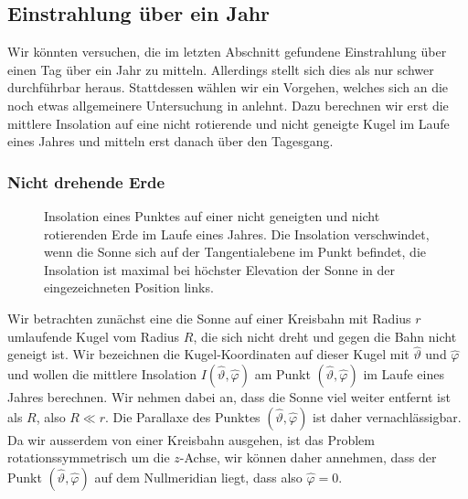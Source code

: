 %
%
%
\subsection{Einstrahlung über ein Jahr}
Wir könnten versuchen, die im letzten Abschnitt gefundene Einstrahlung
über einen Tag über ein Jahr zu mitteln.
Allerdings stellt sich dies als nur schwer durchführbar heraus.
Stattdessen wählen wir ein Vorgehen, welches  sich an die 
noch etwas allgemeinere Untersuchung in 
\cite[section 5]{skript:mcgeheelehman}
anlehnt.
Dazu berechnen wir erst die mittlere Insolation auf eine nicht
rotierende und nicht geneigte Kugel im Laufe eines Jahres und
mitteln erst danach über den Tagesgang.

\subsubsection{Nicht drehende Erde}
\begin{figure}%
\centering%
\caption{Insolation eines Punktes auf einer nicht geneigten 
und nicht rotierenden Erde im Laufe eines Jahres.
Die Insolation verschwindet, wenn die Sonne sich auf der Tangentialebene
im Punkt befindet, die Insolation ist maximal bei höchster Elevation
der Sonne in der eingezeichneten Position links.
\label{skript:insolation:fest}}
\end{figure}%
Wir betrachten zunächst eine die Sonne auf einer Kreisbahn mit Radius $r$
umlaufende Kugel vom Radius $R$, die sich nicht dreht und gegen die Bahn
nicht geneigt ist.
Wir bezeichnen die Kugel-Koordinaten auf dieser Kugel mit $\hat\vartheta$
und $\hat\varphi$ und wollen die mittlere Insolation
$I(\hat\vartheta,\hat\varphi)$ am Punkt $(\hat\vartheta,\hat\varphi)$
im Laufe eines Jahres berechnen.
Wir nehmen dabei an, dass die Sonne viel weiter entfernt ist als $R$,
also $R\ll r$.
Die Parallaxe des Punktes $(\hat\vartheta,\hat\varphi)$ ist daher
vernachlässigbar.
Da wir ausserdem von einer Kreisbahn ausgehen, ist das Problem
rotationssymmetrisch um die $z$-Achse, wir können daher annehmen, dass
der Punkt $(\hat\vartheta,\hat\varphi)$ auf dem Nullmeridian liegt,
dass also $\hat\varphi=0$.

